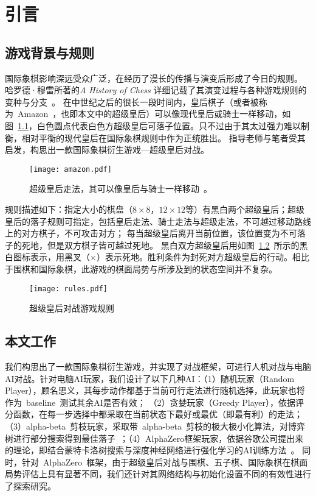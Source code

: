 \chapter{引言}
\label{chap:introduction}

\section{游戏背景与规则}
国际象棋影响深远受众广泛，在经历了漫长的传播与演变后形成了今日的规则。
哈罗德·穆雷所著的\textit{A History of Chess} 详细记载了其演变过程与各种游戏规则的变种与分支~\cite{murray2015history}。
在中世纪之后的很长一段时间内，皇后棋子（或者被称为~Amazon~，也即本文中的超级皇后）可以像现代皇后或骑士一样移动，如图~\ref{fig:superQueen}，白色圆点代表白色方超级皇后可落子位置。只不过由于其太过强力难以制衡，相对平衡的现代皇后在国际象棋规则中作为正统胜出。
指导老师与笔者受其启发，构思出一款国际象棋衍生游戏—超级皇后对战。
\begin{figure}[htb]
  \centering
  \texttt{[image: amazon.pdf]}
  \caption[superQueen]{%
    超级皇后走法，其可以像皇后与骑士一样移动~\cite{wikiAmazon}。}
  \label{fig:superQueen}
\end{figure}
规则描述如下：指定大小的棋盘（$8\times8$，$12\times12$等）有黑白两个超级皇后；超级皇后的落子规则可指定，包括皇后走法、骑士走法与超级走法，不可越过移动路线上的对方棋子，不可攻击对方；
每当超级皇后离开当前位置，该位置变为不可落子的死地，但是双方棋子皆可越过死地。
黑白双方超级皇后用如图~\ref{fig:superQueenRules}~所示的黑白图标表示，用黑叉（$\mathbf{\times}$）表示死地。胜利条件为封死对方超级皇后的行动。相比于围棋和国际象棋，此游戏的棋面局势与所涉及到的状态空间并不复杂。

\begin{figure}[htb]
    \centering
    \texttt{[image: rules.pdf]}
    \caption[superQueenRules]{%
      超级皇后对战游戏规则%
      }
    \label{fig:superQueenRules}
  \end{figure}


\section{本文工作}
我们构思出了一款国际象棋衍生游戏，并实现了对战框架，可进行人机对战与电脑AI对战。针对电脑AI玩家，我们设计了以下几种AI：（1）随机玩家（Random Player），顾名思义，其每步动作都基于当前可行走法进行随机选择，此玩家也将作为~baseline~测试其余AI是否有效；
（2）贪婪玩家（Greedy Player），依据评分函数，在每一步选择中都采取在当前状态下最好或最优（即最有利）的走法；（3）alpha-beta~剪枝玩家，采取带~alpha-beta~剪枝的极大极小化算法，对博弈树进行部分搜索得到最佳落子~\cite{russell2010artificial}；（4）AlphaZero框架玩家，依据谷歌公司提出来的理论，即结合蒙特卡洛树搜索与深度神经网络进行强化学习的AI训练方法~\cite{Silver1140}。
同时，针对~AlphaZero~框架，由于超级皇后对战与围棋、五子棋、国际象棋在棋面局势评估上具有显著不同，我们还针对其网络结构与初始化设置不同的有效性进行了探索研究。

